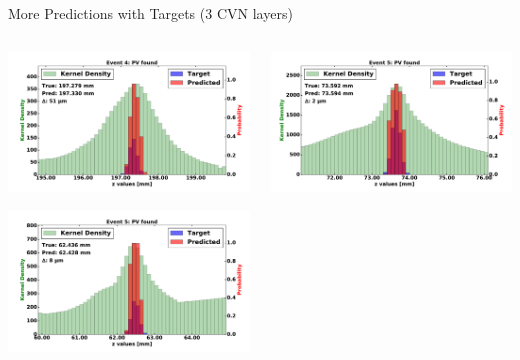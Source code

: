\begin{frame}{More Predictions with Targets (3 CVN layers)}
  \begin{columns}[c]
        \begin{center}
            \includegraphics[width=1\textwidth,height=0.45\textwidth, trim=18 0 18 0]{images/120000_3layer_28.pdf}

            \includegraphics[width=1\textwidth, height=0.45\textwidth,trim=18 0 18 0]{images/120000_3layer_29.pdf}

        \end{center}
        \begin{center}
           \includegraphics[width=1\textwidth, height=0.45\textwidth, trim=18 0 18 0]{images/120000_3layer_30.pdf}


\end{center}
\end{columns}
\end{frame}
